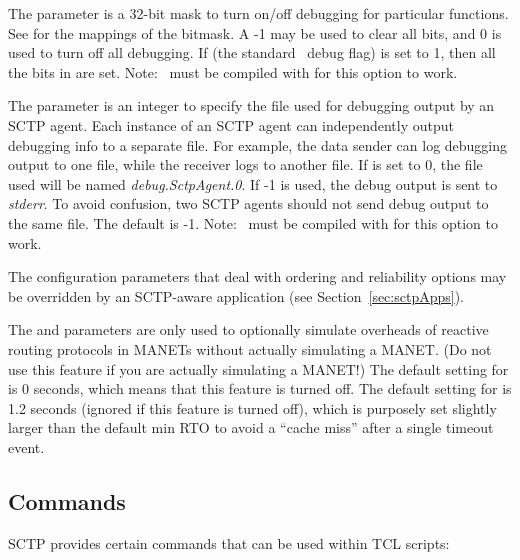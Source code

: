 	 The  parameter is a 32-bit mask to turn on/off
	 debugging for particular functions. See
	  for the mappings of the bitmask. A -1
	 may be used to clear all bits, and 0 is used to turn off all
	 debugging. If  (the standard \ns~debug flag) is set to
	 1, then all the bits in  are set. Note: \ns~must
	 be compiled with  for this option to work.

	 The  parameter is an integer to specify the
	 file used for debugging output by an SCTP agent. Each instance of
	 an SCTP agent can independently output debugging info to a
	 separate file. For example, the data sender can log debugging
	 output to one file, while the receiver logs to another file. If
	  is set to 0, the file used will be named
	 {\em debug.SctpAgent.0}. If -1 is used, the debug output is sent
	 to {\em stderr}. To avoid confusion, two SCTP agents should not
	 send debug output to the same file. The default is -1.  Note:
	 \ns~must be compiled with  for this option to work.

	 The configuration parameters that deal with ordering and
	 reliability options may be overridden by an SCTP-aware
	 application (see Section~\ref{sec:sctpApps}).

	 The  and 
	 parameters are only used to optionally simulate overheads of
	 reactive routing protocols in MANETs without actually simulating
	 a MANET. (Do not use this feature if you are actually simulating
	 a MANET!) The default setting for  is 0
	 seconds, which means that this feature is turned off. The default
	 setting for  is 1.2 seconds (ignored if
	 this feature is turned off), which is purposely set slightly
	 larger than the default min RTO to avoid a ``cache miss'' after a
	 single timeout event.

      \subsection{Commands}
      \label{sec:sctpCommands}

	 SCTP provides certain commands that can be used within TCL
	 scripts:

